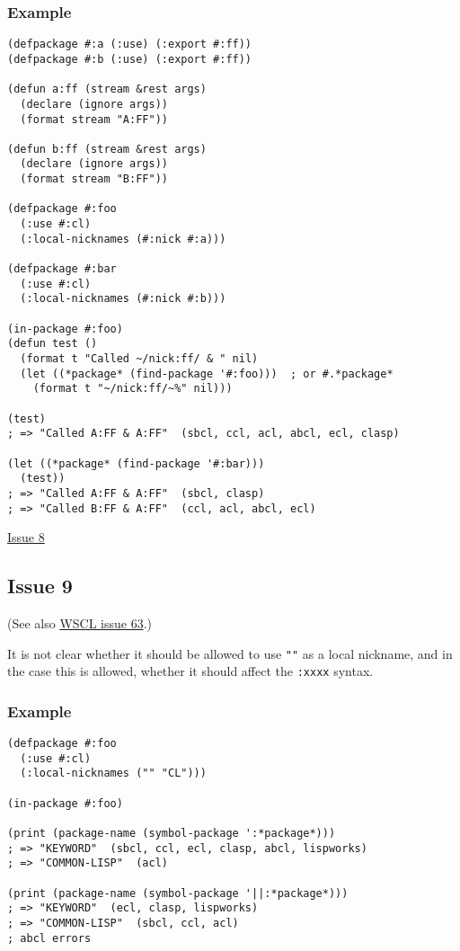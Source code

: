 \documentclass[11pt]{article}
\begin{document}
\subsubsection{Example}
\label{sec:org87b3c97}
\begin{verbatim}
(defpackage #:a (:use) (:export #:ff))
(defpackage #:b (:use) (:export #:ff))

(defun a:ff (stream &rest args)
  (declare (ignore args))
  (format stream "A:FF"))

(defun b:ff (stream &rest args)
  (declare (ignore args))
  (format stream "B:FF"))

(defpackage #:foo
  (:use #:cl)
  (:local-nicknames (#:nick #:a)))

(defpackage #:bar
  (:use #:cl)
  (:local-nicknames (#:nick #:b)))

(in-package #:foo)
(defun test ()
  (format t "Called ~/nick:ff/ & " nil)
  (let ((*package* (find-package '#:foo)))  ; or #.*package*
    (format t "~/nick:ff/~%" nil)))

(test)
; => "Called A:FF & A:FF"  (sbcl, ccl, acl, abcl, ecl, clasp)

(let ((*package* (find-package '#:bar)))
  (test))
; => "Called A:FF & A:FF"  (sbcl, clasp)
; => "Called B:FF & A:FF"  (ccl, acl, abcl, ecl)
\end{verbatim}
\href{./issues/8.org}{Issue 8}

\subsection{Issue 9}
\label{sec:orge993333}
(See also \href{https://github.com/s-expressionists/wscl/issues/63}{WSCL issue 63}.)

It is not clear whether it should be allowed to use \texttt{""} as a local nickname,
and in the case this is allowed, whether it should affect the \texttt{:xxxx} syntax.
\subsubsection{Example}
\label{sec:orgd173886}
\begin{verbatim}
(defpackage #:foo
  (:use #:cl)
  (:local-nicknames ("" "CL")))

(in-package #:foo)

(print (package-name (symbol-package ':*package*)))
; => "KEYWORD"  (sbcl, ccl, ecl, clasp, abcl, lispworks)
; => "COMMON-LISP"  (acl)

(print (package-name (symbol-package '||:*package*)))
; => "KEYWORD"  (ecl, clasp, lispworks)
; => "COMMON-LISP"  (sbcl, ccl, acl)
; abcl errors
\end{verbatim}
\end{document}
